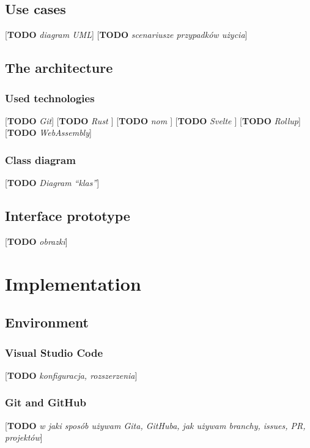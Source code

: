 \documentclass[english,engineering]{wizthesis}
\newcommand{\todo}[1]{{\color{red}[\textbf{TODO} \textit{#1}]}}
\begin{document}
\section{Use cases}

\todo{diagram UML}
\todo{scenariusze przypadków użycia}

\section{The architecture}

\subsection{Used technologies}

\todo{Git}
\todo{Rust \cite{rust-book}}
\todo{nom \cite{couprie-2015}}
\todo{Svelte \cite{svelte-docs}}
\todo{Rollup}
\todo{WebAssembly}

\subsection{Class diagram}

\todo{Diagram ``klas''}

\section{Interface prototype}

\todo{obrazki}

\chapter{Implementation}

\section{Environment}

\subsection{Visual Studio Code}

\todo{konfiguracja, rozszerzenia}

\subsection{Git and GitHub}

\todo{w jaki sposób używam Gita, GitHuba, jak używam branchy, issues, PR,
projektów}
\end{document}
